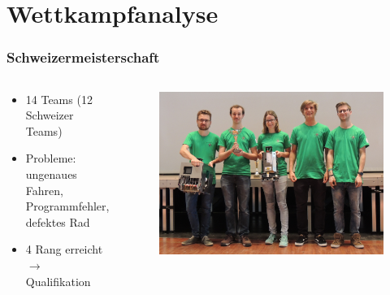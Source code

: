 \section{Wettkampfanalyse}

%	

\begin{frame}
	\frametitle{Schweizermeisterschaft}
	
	\vspace{-2em}
	
	\begin{columns}[t]
		\begin{column}{0.5\textwidth}
			\begin{center}
				\begin{itemize}
					\item 14 Teams (12 Schweizer Teams)
					\item Probleme: ungenaues Fahren, Programmfehler, defektes Rad
					\item 4 Rang erreicht $\rightarrow$ Qualifikation
				\end{itemize}
			\end{center}
		\end{column}
		\begin{column}{0.5\textwidth}
			\begin{figure}
				\includegraphics[width=0.9\columnwidth]{../images/presentation/swisseurobot.jpg}
			\end{figure}
		\end{column}
	\end{columns}
	
\end{frame}

